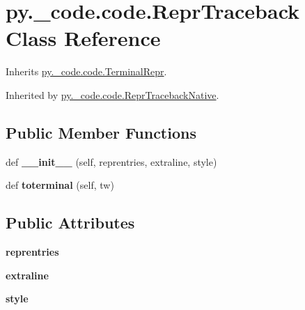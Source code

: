 \hypertarget{classpy_1_1__code_1_1code_1_1_repr_traceback}{}\section{py.\+\_\+code.\+code.\+Repr\+Traceback Class Reference}
\label{classpy_1_1__code_1_1code_1_1_repr_traceback}


Inherits \hyperlink{classpy_1_1__code_1_1code_1_1_terminal_repr}{py.\+\_\+code.\+code.\+Terminal\+Repr}.



Inherited by \hyperlink{classpy_1_1__code_1_1code_1_1_repr_traceback_native}{py.\+\_\+code.\+code.\+Repr\+Traceback\+Native}.

\subsection*{Public Member Functions}
\begin{DoxyCompactItemize}
\item 
\mbox{\label{classpy_1_1__code_1_1code_1_1_repr_traceback_af5d8f479a8d582e39b58fca7ec8c3679}} 
def {\bfseries \+\_\+\+\_\+init\+\_\+\+\_\+} (self, reprentries, extraline, style)
\item 
\mbox{\label{classpy_1_1__code_1_1code_1_1_repr_traceback_a9067bc79bc037c0a2189729d86d0924f}} 
def {\bfseries toterminal} (self, tw)
\end{DoxyCompactItemize}
\subsection*{Public Attributes}
\begin{DoxyCompactItemize}
\item 
\mbox{\label{classpy_1_1__code_1_1code_1_1_repr_traceback_a4c51ed8a111f7593d92940ad01c61cc0}} 
{\bfseries reprentries}
\item 
\mbox{\label{classpy_1_1__code_1_1code_1_1_repr_traceback_a8be8fe38858a3ab8a982c5ddb415b6e8}} 
{\bfseries extraline}
\item 
\mbox{\label{classpy_1_1__code_1_1code_1_1_repr_traceback_ab614457ab6cc54fec97e1bfb0f1f611e}} 
{\bfseries style}
\end{DoxyCompactItemize}
